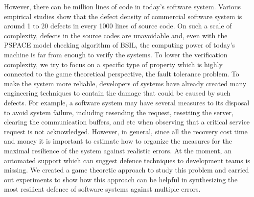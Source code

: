 However, there can be million lines of code in today's software system.
Various empirical studies show that the defect density of commercial software system is around 1 to 20 defects in every 1000 lines of source code\cite{Sommerville:2006:SE:1196763}.
On such a scale of complexity, defects in the source codes are unavoidable and, even with the PSPACE model checking algorithm of BSIL, the computing power of today's machine is far from enough to verify the systems.   
To lower the verification complexity, we try to focus on a specific type of property which is highly connected to the game theoretical perspective, the fault tolerance problem.
To make the system more reliable, developers of systems have already created many engineering techniques to contain the damage that could be caused by such defects.
For example, a software system may have several measures to its disposal to avoid system failure, including resending the request, resetting the server, clearing the communication buffers, and etc when observing that a critical service request is not acknowledged.
However, in general, since all the recovery cost time and money it is important to estimate how to organize the measures for the maximal resilience of the system against realistic errors.
At the moment, an automated support which can suggest defence techniques to development teams is missing.
We created a game theoretic approach to study this problem and carried out experiments to show how this approach can be helpful in  synthesizing the most resilient defence of software systems against multiple errors.

\begin{table*}
\begin{center}
\end{center}
\caption{Probabilities of $k$ dense errors} 
\label{tab.mtbf} 
\end{table*}

